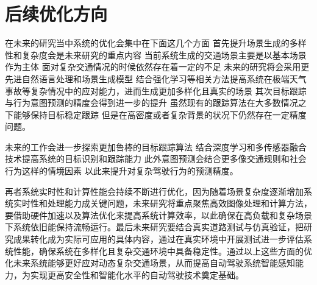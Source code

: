 \section{后续优化方向}

在未来的研究当中系统的优化会集中在下面这几个方面 首先提升场景生成的多样性和复杂度会是未来研究的重点内容 当前系统生成的交通场景主要是以基本场景作为主体 面对复杂交通情况的时候依然存在着一定的不足 未来的研究将会采用更先进自然语言处理和场景生成模型 结合强化学习等相关方法提高系统在极端天气事故等复杂情况中的应对能力，进而生成更加多样化且真实的场景 其次目标跟踪与行为意图预测的精度会得到进一步的提升 虽然现有的跟踪算法在大多数情况之下能够保持目标稳定跟踪 但是在高密度或者复杂背景的状况下仍然存在一定精度问题。

未来的工作会进一步探索更加鲁棒的目标跟踪算法 结合深度学习和多传感器融合技术提高系统的目标识别和跟踪能力 此外意图预测会结合更多像交通规则和社会行为这样的情境因素 以此来提升对复杂驾驶行为的预测精度。


再者系统实时性和计算性能会持续不断进行优化，因为随着场景复杂度逐渐增加系统实时性和处理能力成关键问题，未来研究将重点聚焦高效图像处理和计算方法，要借助硬件加速以及算法优化来提高系统计算效率，以此确保在高负载和复杂场景下系统依旧能保持流畅运行。最后未来研究要结合真实道路测试与仿真验证，把研究成果转化成为实际可应用的具体内容，通过在真实环境中开展测试进一步评估系统性能，确保系统在多样化且复杂交通环境中具备稳定性。通过以上这些方面的优化未来系统能够更好应对动态复杂交通场景，从而提高自动驾驶系统智能感知能力，为实现更高安全性和智能化水平的自动驾驶技术奠定基础。